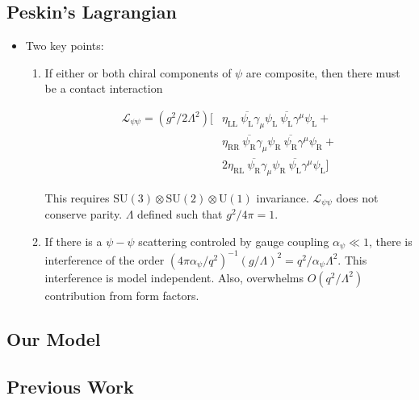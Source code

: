 \subsection{Peskin's Lagrangian}
\begin{itemize}
    \item Two key points: \cite{eichten}
    \begin{enumerate}
        \item If either or both chiral components of $\psi$ are composite, then there must be a contact interaction \cite{eichten}
        \begin{center}
        \begin{equation}%
        \begin{split}
        \mathcal{L}_{\psi\psi} = (g^2/2\Lambda^2) [& \eta_\text{LL}~\overline{\psi_\text{L}}\gamma_\mu\psi_\text{L}~\overline{\psi_\text{L}}\gamma^\mu\psi_\text{L} +\\
                                                   & \eta_\text{RR}~\overline{\psi_\text{R}}\gamma_\mu\psi_\text{R}~\overline{\psi_\text{R}}\gamma^\mu\psi_\text{R} +\\
                                                   & 2\eta_\text{RL}~\overline{\psi_\text{R}}\gamma_\mu\psi_\text{R}~\overline{\psi_\text{L}}\gamma^\mu\psi_\text{L}]
        \end{split}
        \end{equation}
        \end{center}
        This requires $\text{SU}(3)\otimes\text{SU}(2)\otimes\text{U}(1)$ invariance. $\mathcal{L}_{\psi\psi}$ does not conserve parity. $\Lambda$ defined such that $g^2/4\pi=1$.
        \item If there is a $\psi-\psi$ scattering controled by gauge coupling $\alpha_\psi\ll1$, there is interference of the order $(4\pi\alpha_\psi/q^2)^{-1}(g/\Lambda)^2 = q^2/\alpha_\psi\Lambda^2$. This interference is model independent. Also, overwhelms $O(q^2/\Lambda^2)$ contribution from form factors. \cite{eichten}
    \end{enumerate}
\end{itemize}

\subsection{Our Model}

\subsection{Previous Work}

